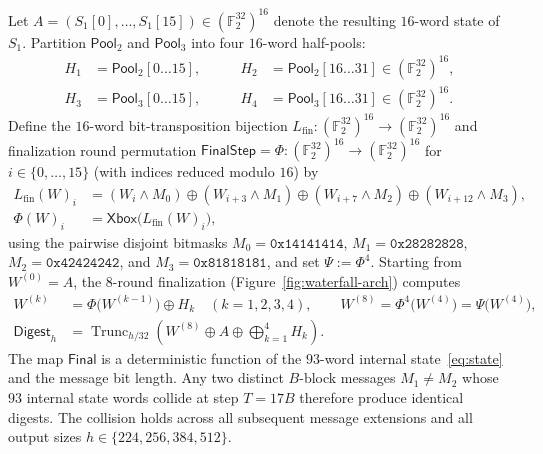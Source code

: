 \documentclass[11pt,a4paper]{article}
\theoremstyle{definition}
\theoremstyle{remark}
\newcommand{\Ftwo}{\mathbb{F}_2}
\newcommand{\Xbox}{\mathsf{Xbox}}
\newcommand{\FinalStep}{\mathsf{FinalStep}}
\newcommand{\Pool}{\mathsf{Pool}}
\newcommand{\Trunc}{\operatorname{Trunc}}
\begin{document}
Let $A = (S_1[0], \dots, S_1[15]) \in (\Ftwo^{32})^{16}$ denote the resulting $16$-word state of $S_1$. Partition $\Pool_2$ and $\Pool_3$ into four $16$-word half-pools:
\[
\begin{aligned}
H_1 &= \Pool_2[0 \dots 15], \qquad & H_2 &= \Pool_2[16 \dots 31] \in (\Ftwo^{32})^{16}, \\
H_3 &= \Pool_3[0 \dots 15], \qquad & H_4 &= \Pool_3[16 \dots 31] \in (\Ftwo^{32})^{16}.
\end{aligned}
\]
Define the $16$-word bit-transposition bijection $L_{\mathrm{fin}} : (\Ftwo^{32})^{16} \to (\Ftwo^{32})^{16}$ and finalization round permutation $\FinalStep = \Phi : (\Ftwo^{32})^{16} \to (\Ftwo^{32})^{16}$ for $i \in \{0, \dots, 15\}$ (with indices reduced modulo $16$) by
\[
\begin{aligned}
L_{\mathrm{fin}}(W)_i &= (W_i \wedge M_0) \oplus (W_{i+3} \wedge M_1) \oplus (W_{i+7} \wedge M_2) \oplus (W_{i+12} \wedge M_3), \\
\Phi(W)_i &= \Xbox\big(L_{\mathrm{fin}}(W)_i\big),
\end{aligned}
\]
using the pairwise disjoint bitmasks $M_0 = \mathtt{0x14141414}$, $M_1 = \mathtt{0x28282828}$, $M_2 = \mathtt{0x42424242}$, and $M_3 = \mathtt{0x81818181}$, and set $\Psi := \Phi^4$. Starting from $W^{(0)} = A$, the $8$-round finalization (Figure~\ref{fig:waterfall-arch}) computes
\[
\begin{aligned}
W^{(k)} &= \Phi\big(W^{(k-1)}\big) \oplus H_k \quad (k = 1, 2, 3, 4), \qquad W^{(8)} = \Phi^4\big(W^{(4)}\big) = \Psi\big(W^{(4)}\big), \\
\mathsf{Digest}_h &= \Trunc_{h/32}\!\left(W^{(8)} \oplus A \oplus \bigoplus_{k=1}^{4} H_k\right).
\end{aligned}
\]
The map $\mathsf{Final}$ is a deterministic function of the $93$-word internal state~\eqref{eq:state} and the message bit length. Any two distinct $B$-block messages $M_1 \neq M_2$ whose $93$ internal state words collide at step $T = 17 B$ therefore produce identical digests. The collision holds across all subsequent message extensions and all output sizes $h \in \{224, 256, 384, 512\}$.
\end{document}
